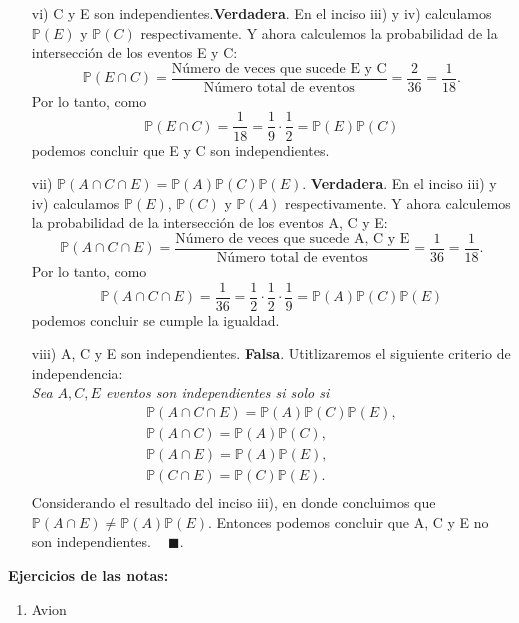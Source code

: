 \documentclass[11pt,letterpaper]{article}
\newcommand{\mP}{\mathbb{P}}
\newcommand{\finf}{\blacksquare.}
\begin{document}
\begin{itemize}
\begin{itemize}
\item[vi)] C y E son independientes.\textbf{Verdadera}. En el inciso iii) y iv) calculamos $\mP(E)$ y $\mP(C)$ respectivamente. Y ahora calculemos la probabilidad de la intersección de los eventos E y C:
$$\mP(E\cap C)= \frac{\text{Número de veces que sucede E y C}}{\text{Número total de eventos}}=\frac{2}{36}=\frac{1}{18}.$$
Por lo tanto, como
$$\mP(E\cap C)= \frac{1}{18} = \frac{1}{9}\cdot \frac{1}{2}=\mP(E)\mP(C)$$
podemos concluir que E y C son independientes.

\item[vii)] $\mP (A \cap C \cap E) = \mP (A)\mP (C)\mP (E)$. \textbf{Verdadera}. En el inciso iii) y iv) calculamos $\mP(E)$, $\mP(C)$ y $\mP(A)$ respectivamente. Y ahora calculemos la probabilidad de la intersección de los eventos A, C y E:
$$\mP(A\cap C\cap E)= \frac{\text{Número de veces que sucede A, C y E}}{\text{Número total de eventos}}=\frac{1}{36}=\frac{1}{18}.$$
Por lo tanto, como
$$\mP(A\cap C\cap E)= \frac{1}{36} = \frac{1}{2}\cdot \frac{1}{2} \cdot\frac{1}{9}=\mP(A)\mP(C)\mP(E)$$
podemos concluir se cumple la igualdad. 

\item[viii)] A, C y E son
independientes. \textbf{Falsa}. Utitlizaremos el siguiente criterio de independencia:\\

\textit{Sea $A, C, E$ eventos son independientes si solo si
\begin{equation*}
\begin{array}{c}
\mP(A\cap C \cap E) =\mP(A)\mP(C)\mP(E),\\
\mP(A\cap C)= \mP(A)\mP(C),\\
\mP(A\cap E)= \mP(A)\mP(E),\\
\mP(C\cap E)= \mP(C)\mP(E).\\
\end{array}
\end{equation*}
}
Considerando el resultado del inciso iii), en donde concluimos que $\mP(A\cap E)\neq\mP(A)\mP(E)$. Entonces podemos concluir que A, C y E no son independientes. $\ \ \ \ \finf$
\end{itemize}
\end{itemize}

\textbf{Ejercicios de las notas: }
\begin{enumerate}
\item Avion
\end{enumerate}
\end{document}
